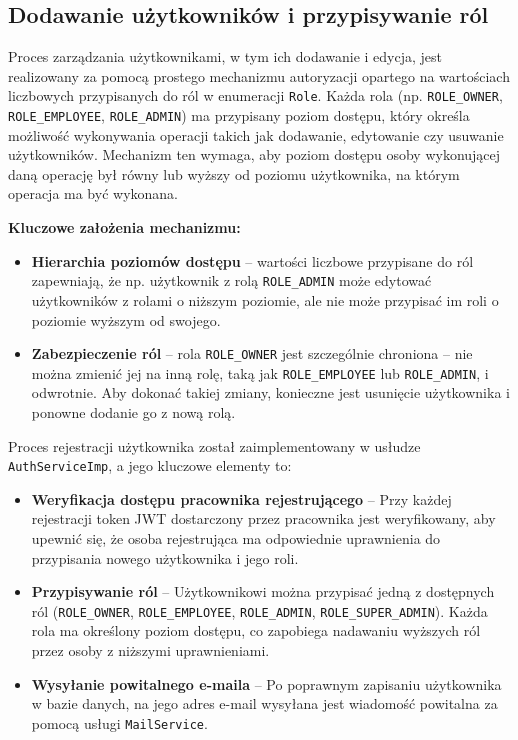 \subsection{Dodawanie użytkowników i przypisywanie ról}

Proces zarządzania użytkownikami, w tym ich dodawanie i edycja, jest realizowany za pomocą prostego mechanizmu autoryzacji opartego na wartościach liczbowych przypisanych do ról w enumeracji \texttt{Role}. Każda rola (np. \texttt{ROLE\_OWNER}, \texttt{ROLE\_EMPLOYEE}, \texttt{ROLE\_ADMIN}) ma przypisany poziom dostępu, który określa możliwość wykonywania operacji takich jak dodawanie, edytowanie czy usuwanie użytkowników. Mechanizm ten wymaga, aby poziom dostępu osoby wykonującej daną operację był równy lub wyższy od poziomu użytkownika, na którym operacja ma być wykonana.

\textbf{Kluczowe założenia mechanizmu:}
\begin{itemize}
    \item \textbf{Hierarchia poziomów dostępu} -- wartości liczbowe przypisane do ról zapewniają, że np. użytkownik z rolą \texttt{ROLE\_ADMIN} może edytować użytkowników z rolami o niższym poziomie, ale nie może przypisać im roli o poziomie wyższym od swojego.
    \item \textbf{Zabezpieczenie ról} -- rola \texttt{ROLE\_OWNER} jest szczególnie chroniona – nie można zmienić jej na inną rolę, taką jak \texttt{ROLE\_EMPLOYEE} lub \texttt{ROLE\_ADMIN}, i odwrotnie. Aby dokonać takiej zmiany, konieczne jest usunięcie użytkownika i ponowne dodanie go z nową rolą.
\end{itemize}

Proces rejestracji użytkownika został zaimplementowany w usłudze \texttt{AuthServiceImp}, a jego kluczowe elementy to:
\begin{itemize}
    \item \textbf{Weryfikacja dostępu pracownika rejestrującego} -- Przy każdej rejestracji token JWT dostarczony przez pracownika jest weryfikowany, aby upewnić się, że osoba rejestrująca ma odpowiednie uprawnienia do przypisania nowego użytkownika i jego roli.
    \item \textbf{Przypisywanie ról} -- Użytkownikowi można przypisać jedną z dostępnych ról (\texttt{ROLE\_OWNER}, \texttt{ROLE\_EMPLOYEE}, \texttt{ROLE\_ADMIN}, \texttt{ROLE\_SUPER\_ADMIN}). Każda rola ma określony poziom dostępu, co zapobiega nadawaniu wyższych ról przez osoby z niższymi uprawnieniami.
    \item \textbf{Wysyłanie powitalnego e-maila} -- Po poprawnym zapisaniu użytkownika w bazie danych, na jego adres e-mail wysyłana jest wiadomość powitalna za pomocą usługi \texttt{MailService}.
\end{itemize}

